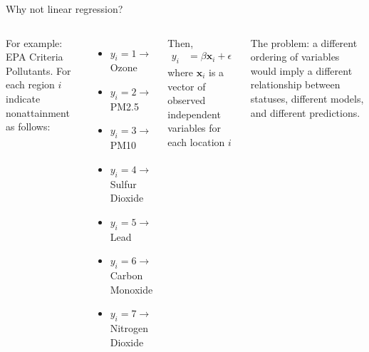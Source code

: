 \documentclass[aspectratio=169]{beamer}
\begin{document}
\begin{frame}{Why not linear regression?}

\begin{columns}
For example:  EPA Criteria Pollutants.  For each region $i$ indicate nonattainment as follows:
\begin{itemize}
\item $y_i = 1 \rightarrow$ Ozone 
\item $y_i = 2 \rightarrow$ PM2.5 
\item $y_i = 3 \rightarrow$ PM10 
\item $y_i = 4 \rightarrow$ Sulfur Dioxide 
\item $y_i = 5 \rightarrow$ Lead 
\item $y_i = 6 \rightarrow$ Carbon Monoxide 
\item $y_i =7 \rightarrow$ Nitrogen Dioxide 
\end{itemize}

Then,
\begin{align*}
y_i &= \beta\mathbf{x}_i + \epsilon
\end{align*}
where $\mathbf{x}_i$ is a vector of observed independent variables for each location $i$

\pause

\vspace{5mm}

The problem: a different ordering of variables would imply a different relationship between statuses, different models, and different predictions.
\end{columns}

\end{frame}
\end{document}
